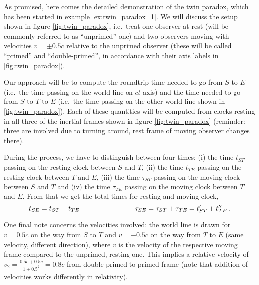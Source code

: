 \begin{ex}\label{ex:twin_paradox_2}
	As promised, here comes the detailed demonstration of the twin paradox, which has been started in example \ref{ex:twin_paradox_1}. We will discuss the setup shown in figure \ref{fig:twin_paradox}, i.e.~treat one observer at rest (will be commonly referred to as \enquote{unprimed} one) and two observers moving with velocities $v = \pm 0.5 c$ relative to the unprimed observer (these will be called \enquote{primed} and \enquote{double-primed}, in accordance with their axis labels in \ref{fig:twin_paradox}).
	
	Our approach will be to compute the roundtrip time needed to go from $S$ to $E$ (i.e.~the time passing on the world line on $ct$ axis) and the time needed to go from $S$ to $T$ to $E$ (i.e.~the time passing on the other world line shown in \ref{fig:twin_paradox}). Each of these quantities will be computed from clocks resting in all three of the inertial frames shown in figure \ref{fig:twin_paradox} (reminder: three are involved due to turning around, rest frame of moving observer changes there).
	
	
	During the process, we have to distinguish between four times: (i) the time $t_{ST}$ passing on the resting clock between $S$ and $T$, (ii) the time $t_{TE}$ passing on the resting clock between $T$ and $E$, (iii) the time $\tau_{ST}$ passing on the moving clock between $S$ and $T$ and (iv) the time $\tau_{TE}$ passing on the moving clock between $T$ and $E$. From that we get the total times for resting and moving clock,
	\begin{equation*}
		t_{SE} = t_{ST} + t_{TE}
		\qquad \qquad \qquad \qquad
		\tau_{SE} = \tau_{ST} + \tau_{TE} = t'_{ST} + t''_{TE} \, .
	\end{equation*}
	
	One final note concerns the velocities involved: the world line is drawn for $v = 0.5 c$ on the way from $S$ to $T$ and $v = -0.5 c$ on the way from $T$ to $E$ (same velocity, different direction), where $v$ is the velocity of the respective moving frame compared to the unprimed, resting one. This implies a relative velocity of $v_2 = \frac{0.5 c + 0.5 c}{1 + 0.5^2} = 0.8 c$ from double-primed to primed frame (note that addition of velocities works differently in relativity).
	

\end{ex}
